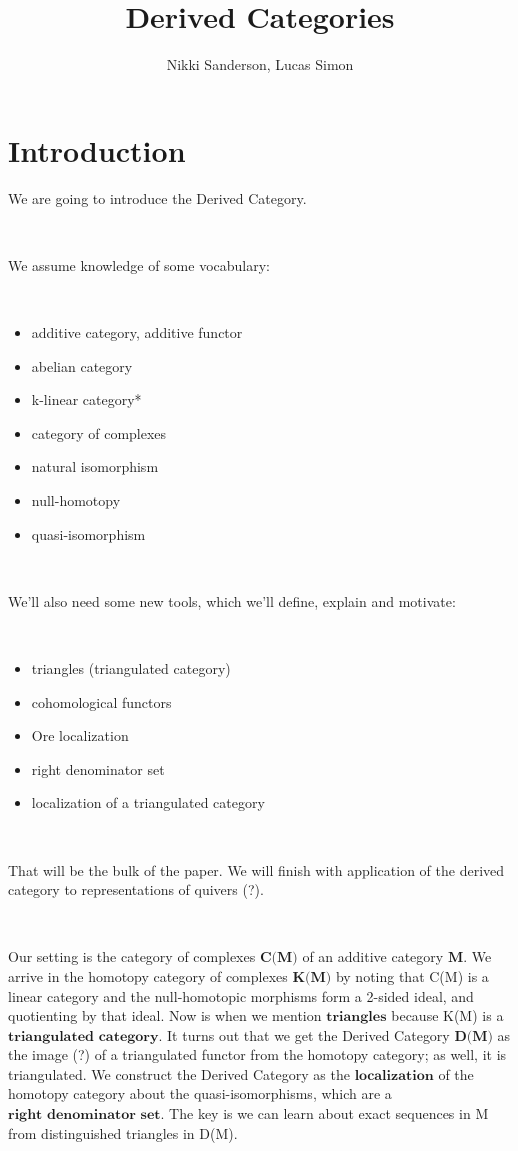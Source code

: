 \documentclass[12pt]{amsart}    %
\title{Derived Categories}
\author{Nikki Sanderson, Lucas Simon}
\theoremstyle{definition}
\begin{document}
\maketitle                 %

\section{Introduction}

We are going to introduce the Derived Category.  

\

We assume knowledge of some vocabulary:

\

\begin{itemize}
\item additive category, additive functor 
\item abelian category
\item k-linear category*
\item category of complexes
\item natural isomorphism
\item null-homotopy
\item quasi-isomorphism
\end{itemize}

\

We'll also need some new tools, which we'll define, explain and motivate:

\

\begin{itemize}
\item triangles (triangulated category)
\item cohomological functors
\item Ore localization
\item right denominator set
\item localization of a triangulated category
\end{itemize}

\

That will be the bulk of the paper.  We will finish with application of the derived category to representations of quivers (?).

\

Our setting is the category of complexes $\textbf{C(M)}$ of an additive category $\textbf{M}$.  We arrive in the homotopy category of complexes $\textbf{K(M)}$ by noting that C(M) is a linear category and the null-homotopic morphisms form a 2-sided ideal, and quotienting by that ideal.  Now is when we mention $\textbf{triangles}$ because K(M) is a $\textbf{triangulated category}$.  It turns out that we get the Derived Category $\textbf{D(M)}$ as the image (?) of a triangulated functor from the homotopy category; as well, it is triangulated.  We construct the Derived Category as the $\textbf{localization}$ of the homotopy category about the quasi-isomorphisms, which are a $\textbf{right denominator set}$.  The key is we can learn about exact sequences in M from distinguished triangles in D(M).
\end{document}
